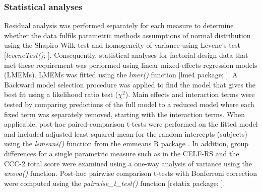 \documentclass[a4paper, twoside]{templates/ociamthesis}
\begin{document}
\hypertarget{statistical-analyses}{%
\subsubsection{Statistical analyses}\label{statistical-analyses}}

Residual analysis was performed separately for each measure to determine whether the data fulfils parametric methods assumptions of normal distribution using the Shapiro-Wilk test \autocite[\emph{shapiro.test()},][]{RCore} and homogeneity of variance using Levene's test {[}\emph{leveneTest()}; \textcite{carPackageR}{]}. Consequently, statistical analyses for factorial design data that met these requirement was performed using linear mixed-effects regression models (LMEMs). LMEMs was fitted using the \emph{lmer()} function {[}lme4 package; \textcite{lme4PackageR}{]}. A Backward model selection procedure was applied to find the model that gives the best fit using a likelihood ratio test (\(\chi^2\)). Main effects and interaction terms were tested by comparing predictions of the full model to a reduced model where each fixed term was separately removed, starting with the interaction terms. When applicable, post-hoc paired-comparison t-tests were performed on the fitted model and included adjusted least-squared-mean for the random intercepts (subjects) using the \emph{lsmeans()} function from the emmeans R package \autocite{emmeansPackageR}. In addition, group differences for a single parametric measure such as in the CELF-RS and the CCC-2 total score were examined using a one-way analysis of variance using the \emph{anova()} function. Post-hoc pairwise comparison t-tests with Bonferroni correction were computed using the \emph{pairwise\_t\_test()} function {[}rstatix package; \textcite{rstatixPackageR}{]}.\\
\end{document}
